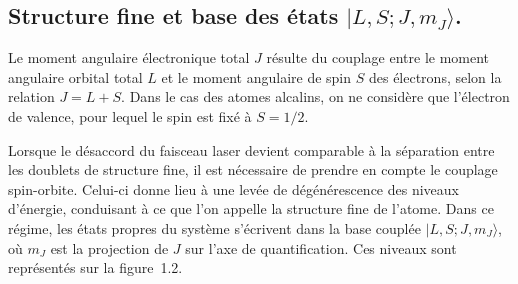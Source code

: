 \subsection{Structure fine et base des états $|L, S; J, m_J\rangle$.}

Le moment angulaire électronique total $J$ résulte du couplage entre le moment angulaire orbital total $L$ et le moment angulaire de spin $S$ des électrons, selon la relation $J = L + S$. Dans le cas des atomes alcalins, on ne considère que l’électron de valence, pour lequel le spin est fixé à $S = 1/2$.

Lorsque le désaccord du faisceau laser devient comparable à la séparation entre les doublets de structure fine, il est nécessaire de prendre en compte le couplage spin-orbite. Celui-ci donne lieu à une levée de dégénérescence des niveaux d’énergie, conduisant à ce que l’on appelle la structure fine de l’atome. Dans ce régime, les états propres du système s’écrivent dans la base couplée $|L, S; J, m_J\rangle$, où $m_J$ est la projection de $J$ sur l’axe de quantification. Ces niveaux sont représentés sur la figure~1.2.


